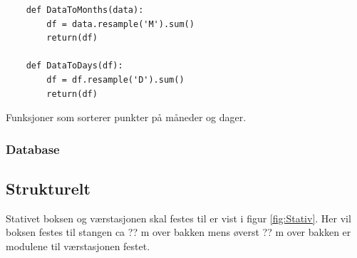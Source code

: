 \begin{code}
\begin{verbatim}
    def DataToMonths(data):
        df = data.resample('M').sum()
        return(df)
    
    def DataToDays(df):
        df = df.resample('D').sum()
        return(df)
\end{verbatim}
\caption{Funksjoner som sorterer punkter på måneder og dager.}
\label{code:dfSortEx1}
\end{code}

\subsubsection{Database}

\subsection{Strukturelt}

Stativet boksen og værstasjonen skal festes til er vist i figur \ref{fig:Stativ}. Her vil boksen festes til stangen ca ?? m over bakken mens øverst ?? m over bakken er modulene til værstasjonen festet. 


